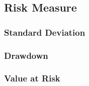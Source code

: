 \subsection{Risk Measure}
\subsubsection{Standard Deviation}

\subsubsection{Drawdown}
\subsubsection{Value at Risk}